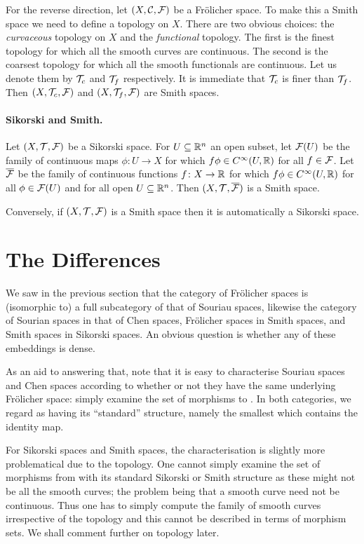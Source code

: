 \documentclass[%
12pt,%
arxiv,%
defaults
]{myclass}
\begin{document}
For the reverse direction, let \((X, \mathcal{C}, \mathcal{F})\) be a Fr\"olicher space.
To make this a Smith space we need to define a topology on \(X\).
There are two obvious choices: the \emph{curvaceous} topology on \(X\) and the \emph{functional} topology.
The first is the finest topology for which all the smooth curves are continuous.
The second is the coarsest topology for which all the smooth functionals are continuous.
Let us denote them by \(\mathcal{T}_c\) and \(\mathcal{T}_f\) respectively.
It is immediate that \(\mathcal{T}_c\) is finer than \(\mathcal{T}_f\).
Then \((X, \mathcal{T}_c, \mathcal{F})\) and \((X, \mathcal{T}_f, \mathcal{F})\) are Smith spaces.

\paragraph{Sikorski and Smith.}

Let \((X, \mathcal{T}, \mathcal{F})\) be a Sikorski space.
For \(U \subseteq \mathbb{R}^n\) an open subset, let \(\mathcal{F}(U)\) be the family of continuous maps \(\phi \colon U \to X\) for which \(f \phi \in C^\infty(U, \mathbb{R})\) for all \(f \in \mathcal{F}\).
Let \(\overline{\mathcal{F}}\) be the family of continuous functions \(f \colon X \to \mathbb{R}\) for which \(f \phi \in C^\infty(U, \mathbb{R})\) for all \(\phi \in \mathcal{F}(U)\) and for all open \(U \subseteq \mathbb{R}^n\).
Then \((X, \mathcal{T}, \overline{\mathcal{F}})\) is a Smith space.

Conversely, if \((X, \mathcal{T}, \mathcal{F})\) is a Smith space then it is automatically a Sikorski space.

\section{The Differences}
\label{sec:diff}

We saw in the previous section that the category of Fr\"olicher spaces is (isomorphic to) a full subcategory of that of Souriau spaces, likewise the category of Sourian spaces in that of Chen spaces, Fr\"olicher spaces in Smith spaces, and Smith spaces in Sikorski spaces.
An obvious question is whether any of these embeddings is dense.

As an aid to answering that, note that it is easy to characterise Souriau spaces and Chen spaces according to whether or not they have the same underlying Fr\"olicher space: simply examine the set of morphisms to \R.
In both categories, we regard \R as having its ``standard'' structure, namely the smallest which contains the identity map.

For Sikorski spaces and Smith spaces, the characterisation is slightly more problematical due to the topology.
One cannot simply examine the set of morphisms from \R with its standard Sikorski or Smith structure as these might not be all the smooth curves; the problem being that a smooth curve need not be continuous.
Thus one has to simply compute the family of smooth curves irrespective of the topology and this cannot be described in terms of morphism sets.
We shall comment further on topology later.
\end{document}
